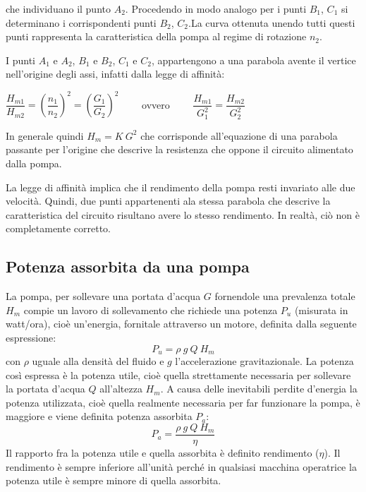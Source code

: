 \documentclass[laurea,oneside,11pt]{USiena_tesiLM}
\begin{document}
che individuano il punto $A_2$. Procedendo in modo analogo per i punti $B_1$, $C_1$ si determinano i corrispondenti punti $B_2$, $C_2$.La curva ottenuta unendo tutti questi punti rappresenta la caratteristica della pompa al regime di rotazione $n_2$.

I punti $A_1$ e $A_2$, $B_1$ e $B_2$, $C_1$ e $C_2$, appartengono a una parabola avente il vertice nell'origine degli assi, infatti dalla legge di affinità:
\begin{center}
$\dfrac{H_{m1}}{H_{m2}}=\left(\dfrac{n_1}{n_2} \right)^2 = \left(\dfrac{G_1}{G_2} \right)^2  \qquad$ ovvero   $\qquad \dfrac{H_{m1}}{G_1^2}=\dfrac{H_{m2}}{G_2^2}$ 
\end{center}
In generale quindi $H_m = K \ G^2$ che corrisponde all'equazione di una parabola passante per l'origine che descrive la resistenza che oppone il circuito alimentato dalla pompa.

La legge di affinità implica che il rendimento della pompa resti invariato alle due velocità. Quindi, due punti appartenenti ala stessa parabola che descrive la caratteristica del circuito risultano avere lo stesso rendimento. In realtà, ciò non è completamente corretto.


\subsection{Potenza assorbita da una pompa}
La pompa, per sollevare una portata d'acqua $G$ fornendole una prevalenza totale $H_m$ compie un lavoro di sollevamento che richiede una potenza $P_u$ (misurata in watt/ora), cioè un'energia, fornitale attraverso un motore, definita dalla seguente espressione:
\begin{equation}
P_u = \rho \ g \ Q \ H_m
\end{equation}
con $\rho$ uguale alla densità del fluido e $g$ l'accelerazione gravitazionale.
La potenza così espressa è la potenza utile, cioè quella strettamente necessaria per sollevare la portata d'acqua $Q$ all'altezza $H_m$. A causa delle inevitabili perdite d'energia la potenza utilizzata, cioè quella realmente necessaria per far funzionare la pompa, è maggiore e viene definita potenza assorbita $P_a$:
\begin{equation}
P_a = \dfrac{\rho \ g \ Q \ H_m}{\eta}
\label{eq:pot}
\end{equation}
Il rapporto fra la potenza utile e quella assorbita è definito rendimento ($\eta$). Il rendimento è sempre inferiore all'unità perché in qualsiasi macchina operatrice la potenza utile è sempre minore di quella assorbita. 
\end{document}
